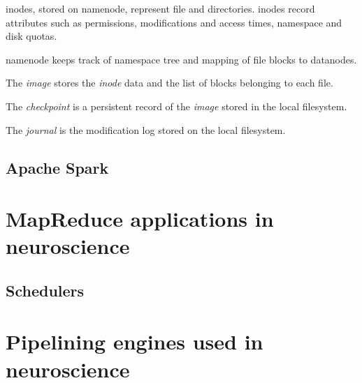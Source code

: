 \documentclass{report}
\begin{document}
 




inodes, stored on namenode, represent file and directories. inodes record attributes such as permissions, modifications and access times, namespace and disk quotas.

namenode keeps track of namespace tree and mapping of file blocks to datanodes.

The \textit{image} stores the \textit{inode} data and the list of blocks belonging to each file.

The \textit{checkpoint} is a persistent record of the \textit{image} stored in the local filesystem.

The \textit{journal} is the modification log stored on the local filesystem.

\section{Apache Spark}
\cite{spark}
\chapter{MapReduce applications in neuroscience}
\cite{thunder}

\section{Schedulers}
\chapter{Pipelining engines used in neuroscience}
\cite{nipype}



\end{document}
